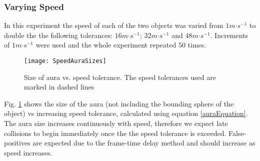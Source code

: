 

\subsubsection{Varying Speed}

In this experiment the speed of each of the two objects was varied from $1m\mathord{\cdot}s^{-1}$ to double the the following tolerances: $16m\mathord{\cdot}s^{-1}$; $32m\mathord{\cdot}s^{-1}$ and $48m\mathord{\cdot}s^{-1}$. Increments of $1m\mathord{\cdot}s^{-1}$ were used and the whole experiment repeated $50$ times.

\begin{figure}
	\centering
	\texttt{[image: SpeedAuraSizes]}
	\caption{Size of aura vs. speed tolerance. The speed tolerances used are marked in dashed lines}
	\label{fig_SpeedAuraSize}
\end{figure}

Fig. \ref{fig_SpeedAuraSize} shows the size of the aura (not including the bounding sphere of the object) vs increasing speed tolerance, calculated using equation \ref{auraEquation}.
The aura size increases continuously with speed, therefore we expect late collisions to begin immediately once the the speed tolerance is exceeded. False-positives are expected due to the frame-time delay method and should increase as speed increases.

